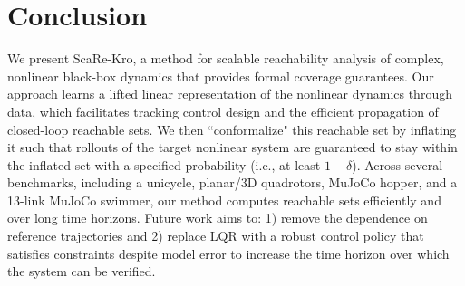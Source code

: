 \vspace{-16pt}
\section{Conclusion}
\label{conclusion}

We present ScaRe-Kro, a method for scalable reachability analysis of complex, nonlinear black-box dynamics that provides formal coverage guarantees. Our approach learns a lifted linear representation of the nonlinear dynamics through data, which facilitates tracking control design and the efficient propagation of closed-loop reachable sets. We then ``conformalize" this reachable set by inflating it such that rollouts of the target nonlinear system are guaranteed to stay within the inflated set with a specified probability (i.e., at least $1-\delta$). Across several benchmarks, including a unicycle, planar/3D quadrotors, MuJoCo hopper, and a 13-link MuJoCo swimmer, our method computes reachable sets efficiently and over long time horizons. Future work aims to: 1) remove the dependence on reference trajectories and 2) replace LQR with a robust control policy that satisfies constraints despite model error to increase the time horizon over which the system can be verified.